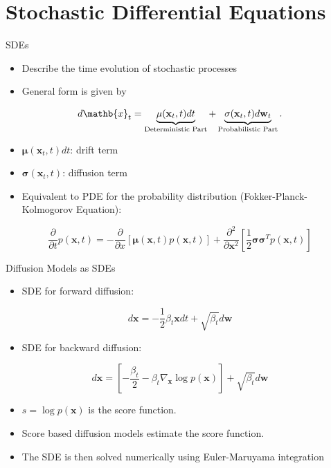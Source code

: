 \documentclass[./main.tex]{subfiles}
\begin{document}
\section{Stochastic Differential Equations}
\label{sec:org506e091}
\begin{frame}[label={sec:org5ef3c69}]{SDEs}
\begin{itemize}
\item Describe the time evolution of stochastic processes
\item General form is given by
\end{itemize}
\begin{equation*}
d\mathb{x}_t=\underbrace{\mathbf{\mu}(\mathbf{x}_t, t)dt}_{\text{Deterministic Part}}+\underbrace{\mathbf{\sigma}(\mathbf{x}_t, t)d\mathbf{w}_t}_{\text{Probabilistic Part}}.
\end{equation*}
\begin{itemize}
\item \(\mathbf{\mu}(\mathbf{x}_t, t)dt\): drift term
\item \(\mathbf{\sigma}(\mathbf{x}_t, t)\): diffusion term
\item Equivalent to PDE for the probability distribution (Fokker-Planck-Kolmogorov Equation):
\end{itemize}
\begin{equation*}
\frac{\partial}{\partial t}p(\mathbf{x}, t)=-\frac{\partial}{\partial x}\left[\mathbf{\mu}(\mathbf{x},t)p(\mathbf{x},t)\right]+\frac{\partial^2}{\partial\mathbf{x}^2}\left[\frac{1}{2}\mathbf{\sigma
}\mathbf{\sigma}^Tp(\mathbf{x},t)\right]
\end{equation*}
\end{frame}
\begin{frame}[label={sec:orgd14ed00}]{Diffusion Models as SDEs}
\begin{itemize}
\item SDE for forward diffusion:
\end{itemize}
\begin{equation*}
d\mathbf{x}=-\frac{1}{2}\beta_t\mathbf{x}dt+\sqrt{\beta_t}d\mathbf{w}
\end{equation*}
\begin{itemize}
\item SDE for backward diffusion:
\end{itemize}
\begin{equation*}
d\mathbf{x}=\left[-\frac{\beta_t}{2}-\beta_t\nabla_\mathbf{x} \log p(\mathbf{x})\right] + \sqrt{\beta_t}d\mathbf{w}
\end{equation*}
\begin{itemize}
\item \(s=\log p(\mathbf{x})\) is the score function.
\item \alert{Score based diffusion models} estimate the score function.
\item The SDE is then solved numerically using Euler-Maruyama integration
\end{itemize}
\end{frame}
\end{document}
